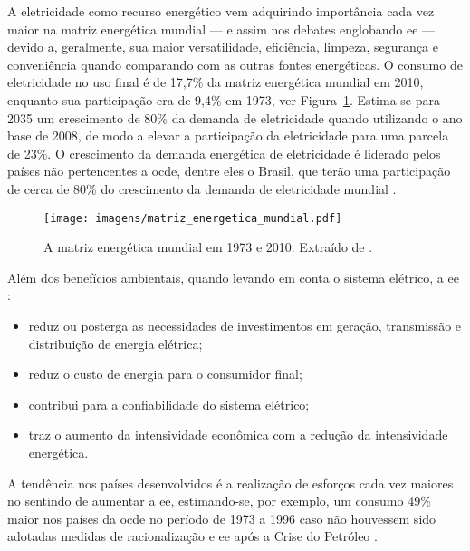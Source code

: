 
A eletricidade como recurso energético vem adquirindo importância cada
vez maior na matriz energética mundial --- e assim nos debates
englobando \gls{ee} --- devido a, geralmente, sua maior versatilidade,
eficiência, limpeza, segurança e conveniência quando comparando com as
outras fontes energéticas. O consumo de eletricidade no uso final é de
17,7\% da matriz energética mundial em 2010, enquanto sua participação
era de 9,4\% em 1973, ver Figura~\ref{fig:matriz_mundial}. Estima-se
para 2035 um crescimento de 80\% da demanda de eletricidade quando
utilizando o ano base de 2008, de modo a elevar a participação da
eletricidade para uma parcela de 23\%. O crescimento da demanda
energética de eletricidade é liderado pelos países não pertencentes a
\gls{ocde}, dentre eles o Brasil, que terão uma participação de cerca
de 80\% do crescimento da demanda de eletricidade mundial
\cite{iea_weo2010}.


\begin{figure}[h!t]
\centering
\texttt{[image: imagens/matriz\_energetica\_mundial.pdf]}
\caption[A matriz energética mundial em 1973 e 2010.]
{A matriz energética mundial em 1973 e 2010. Extraído de
\cite[pp. 28, tradução própria]{world_statics_2012}.}
\label{fig:matriz_mundial}
\end{figure}

Além dos benefícios ambientais, quando levando em conta o sistema
elétrico, a \gls{ee} \cite{jannuzzi,epe_slides_eficiencia}: 

\begin{itemize}
\item reduz ou posterga as necessidades de investimentos em geração,
transmissão e distribuição de energia elétrica; 
\item reduz o custo de energia para o consumidor final; 
\item contribui para a confiabilidade do sistema elétrico; 
\item traz o aumento da intensividade econômica com a redução da
intensividade energética. 
\end{itemize}

A tendência nos países desenvolvidos é a realização de esforços 
cada vez maiores no sentindo de aumentar a \gls{ee}, 
estimando-se, por exemplo, um consumo 49\% maior nos países da \gls{ocde} 
no período de 1973 a 1996 caso não houvessem sido adotadas medidas de 
racionalização e \gls{ee} após a Crise do Petróleo
\cite{goldemberg,epe_slides_eficiencia}.


